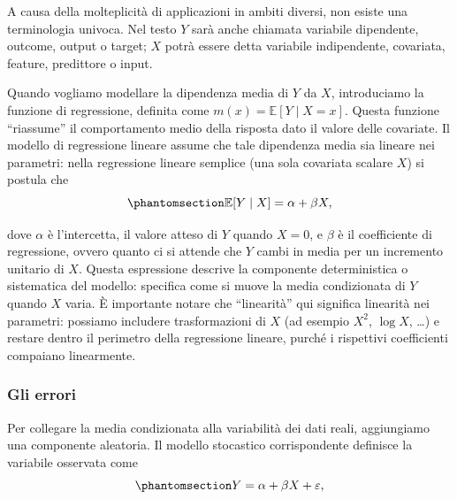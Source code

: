 \documentclass[
  italian,
  a4paper,
  a4paper,
  twoside,
  open=right,
  12pt]{scrbook}
\theoremstyle{definition}
\theoremstyle{remark}
\begin{document}
\begin{tcolorbox}[enhanced jigsaw, breakable, colframe=quarto-callout-note-color-frame, toprule=.15mm, title=\textcolor{quarto-callout-note-color}{\faInfo}\hspace{0.5em}{Nota}, arc=.35mm, colback=white, bottomrule=.15mm, bottomtitle=1mm, colbacktitle=quarto-callout-note-color!10!white, toptitle=1mm, titlerule=0mm, opacityback=0, rightrule=.15mm, opacitybacktitle=0.6, leftrule=.75mm, left=2mm, coltitle=black]

A causa della molteplicità di applicazioni in ambiti diversi, non esiste
una terminologia univoca. Nel testo \(Y\) sarà anche chiamata variabile
dipendente, outcome, output o target; \(X\) potrà essere detta variabile
indipendente, covariata, feature, predittore o input.

\end{tcolorbox}

Quando vogliamo modellare la dipendenza media di \(Y\) da \(X\),
introduciamo la funzione di regressione, definita come
\(m(x) = \mathbb{E}[Y \mid X = x]\). Questa funzione ``riassume'' il
comportamento medio della risposta dato il valore delle covariate. Il
modello di regressione lineare assume che tale dipendenza media sia
lineare nei parametri: nella regressione lineare semplice (una sola
covariata scalare \(X\)) si postula che
\begin{equation}\phantomsection\label{eq-reg_lin_val_atteso}{
\mathbb{E}[Y \mid X] = \alpha + \beta X,
}\end{equation}

dove \(\alpha\) è l'intercetta, il valore atteso di \(Y\) quando
\(X=0\), e \(\beta\) è il coefficiente di regressione, ovvero quanto ci
si attende che \(Y\) cambi in media per un incremento unitario di \(X\).
Questa espressione descrive la componente deterministica o sistematica
del modello: specifica come si muove la media condizionata di \(Y\)
quando \(X\) varia. È importante notare che ``linearità'' qui significa
linearità nei parametri: possiamo includere trasformazioni di \(X\) (ad
esempio \(X^2\), \(\log X\), \ldots) e restare dentro il perimetro della
regressione lineare, purché i rispettivi coefficienti compaiano
linearmente.

\subsubsection{Gli errori}\label{sec-errori}

Per collegare la media condizionata alla variabilità dei dati reali,
aggiungiamo una componente aleatoria. Il modello stocastico
corrispondente definisce la variabile osservata come
\begin{equation}\phantomsection\label{eq-mod_lin}{
Y = \alpha + \beta X + \varepsilon,
}\end{equation}
\end{document}
